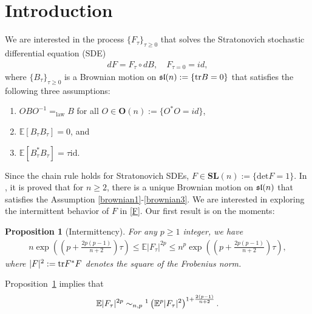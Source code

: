 \documentclass[english, letterpaper,12pt,reqno]{amsart}
\newtheorem{proposition}[theorem]{Proposition}
\theoremstyle{remark}
\theoremstyle{plain}
\newcommand{\1}{\mathbf{1}}
\newcommand{\E}{\mathbb{E}}
\def\bbE{\mathbb E}
\def\tr{{\rm tr}}
\begin{document}

\section{Introduction}
\noindent
We are interested in the  process $\{F_\tau\}_{\tau \geq 0}$ that solves the Stratonovich stochastic differential equation (SDE)
%
\begin{align}\label{F}
    dF=F_\tau\circ dB, \quad F_{\tau=0}=id ,
\end{align}
%
where $\{B_\tau\}_{\tau \geq 0}$ is a Brownian motion on ${\frak{sl}}(n):=\{\tr B=0\}$ that satisfies the following three assumptions:
%
\begin{enumerate}[label=(B\arabic*)]
    \item \label{brownian1} $OB O^{-1}=_{\text{law}}B$ for all $O\in \textbf{O}(n):=\{O^*O=id\}$,
    \item \label{brownian2} $\bbE[B_{\tau} B_\tau] =0$, and
    \item\label{brownian3} $\bbE[B_\tau^* B_\tau]=\tau \text{id}$. 
    \end{enumerate}
Since the chain rule holds for Stratonovich SDEs, $F\in \textbf{SL}(n):=\{\text{det} F=1\}$. In \cite{MOW25}, it is proved that for $n\geq 2$, there is a unique Brownian motion on $\frak{sl}(n)$ that satisfies the Assumption \ref{brownian1}-\ref{brownian3}. We are interested in exploring the intermittent behavior of $F$ in \eqref{F}. Our first result is on the moments:
%
\begin{proposition}[Intermittency] \label{prop:intermittency}For any $p\geq 1$ integer, we have 
%
\begin{align*}
   n \exp\left((p+\frac{2p(p-1)}{n+2})\tau \right) \leq  \E |F_\tau|^{2p}\leq n^{p} \exp\left((p+\frac{2p(p-1)}{n+2})\tau \right),
\end{align*}
%
where $|F|^2:=\tr F^*F$ denotes the square of the Frobenius norm.
\end{proposition}
%
\noindent
Proposition~\ref{prop:intermittency} implies that 
%
\begin{align}
    \E|F_\tau|^{2p} \sim_{n,p}\footnotemark \left(\E^p |F_\tau|^2\right)^{1+\frac{2(p-1)}{n+2}}. \label{2pthmoment}
\end{align}
%
\end{document}
